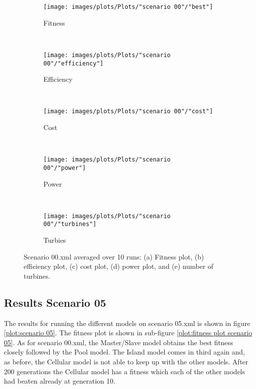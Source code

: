 \begin{figure}[h!]
    \centering
      \begin{subfigure}[b]{0.31\textwidth}
        \texttt{[image: images/plots/Plots/"scenario 00"/"best"]}
        \caption{Fitness}
        \hfill
        \label{plot:fitness plot scenario 00}
    \end{subfigure}
    ~
      \begin{subfigure}[b]{0.31\textwidth}
        \texttt{[image: images/plots/Plots/"scenario 00"/"efficiency"]}
        \caption{Efficiency}
        \hfill
        \label{plot:efficiency plot scenario 00}
    \end{subfigure}
    ~
    \begin{subfigure}[b]{0.31\textwidth}
        \texttt{[image: images/plots/Plots/"scenario 00"/"cost"]}
        \caption{Cost}
        \hfill
        \label{plot:cost plot scenario 00}
    \end{subfigure}
    ~
    \begin{subfigure}[b]{0.31\textwidth}
        \texttt{[image: images/plots/Plots/"scenario 00"/"power"]}
        \caption{Power}
        \hfill
        \label{plot:power plot scenario 00}
    \end{subfigure}
    ~
    \begin{subfigure}[b]{0.31\textwidth}
        \texttt{[image: images/plots/Plots/"scenario 00"/"turbines"]}
        \caption{Turbies}
        \hfill
        \label{plot:turbines plot scenario 00}
    \end{subfigure}
    \caption{Scenario 00.xml averaged over 10 runs: (a) Fitness plot, (b) efficiency plot, (c) cost plot, (d) power plot, and (e) number of turbines.}
    \label{plot:scenario 00}
\end{figure}


\subsection{Results Scenario 05}
The results for running the different models on scenario 05.xml is shown in figure \ref{plot:scenario 05}. The fitness plot is shown in sub-figure \ref{plot:fitness plot scenario 05}. As for scenario 00.xml, the Master/Slave model obtains the best fitness closely followed by the Pool model. The Island model comes in third again and, as before, the Cellular model is not able to keep up with the other models. After 200 generations the Cellular model has a fitness which each of the other models had beaten already at generation 10.\\


